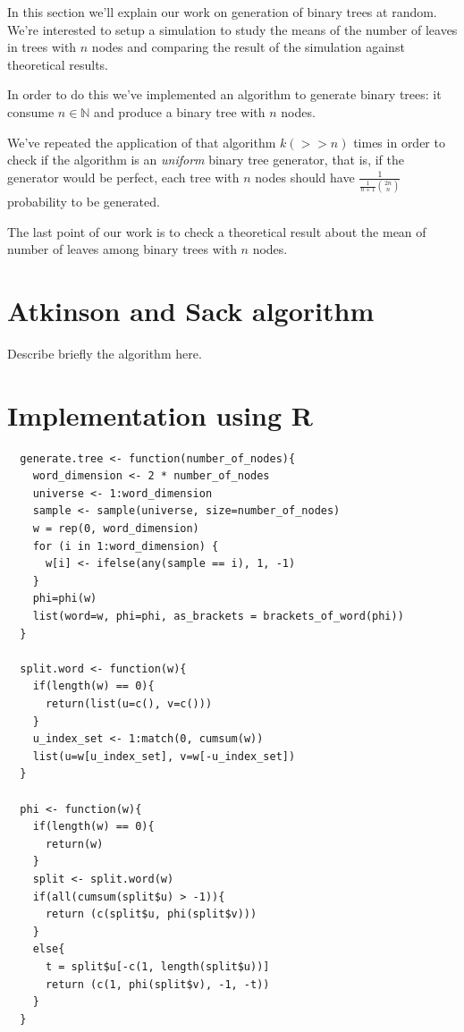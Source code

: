 In this section we'll explain our work on generation of binary trees
at random. We're interested to setup a simulation to study the means
of the number of leaves in trees with $n$ nodes and comparing the
result of the simulation against theoretical results.

In order to do this we've implemented an algorithm to generate binary
trees: it consume $n \in \mathbb{N} $ and produce a binary tree with
$n$ nodes.

We've repeated the application of that algorithm $k (>>
n)$ times in order to check if the algorithm is an \emph{uniform}
binary tree generator, that is, if the generator would be perfect,
each tree with $n$ nodes should have $ \frac{1}{
  \frac{1}{n+1}{{2n}\choose{n}} } $ probability to be generated.

The last point of our work is to check a theoretical result about the
mean of number of leaves among binary trees with $n$ nodes.


\section{Atkinson and Sack algorithm}
Describe briefly the algorithm here.

\section{Implementation using R}

\begin{lstlisting}
  generate.tree <- function(number_of_nodes){
    word_dimension <- 2 * number_of_nodes    
    universe <- 1:word_dimension
    sample <- sample(universe, size=number_of_nodes)
    w = rep(0, word_dimension)
    for (i in 1:word_dimension) {
      w[i] <- ifelse(any(sample == i), 1, -1)
    }    
    phi=phi(w)
    list(word=w, phi=phi, as_brackets = brackets_of_word(phi))
  }

  split.word <- function(w){
    if(length(w) == 0){
      return(list(u=c(), v=c()))
    }    
    u_index_set <- 1:match(0, cumsum(w))
    list(u=w[u_index_set], v=w[-u_index_set])
  }

  phi <- function(w){
    if(length(w) == 0){
      return(w)
    }    
    split <- split.word(w)     
    if(all(cumsum(split$u) > -1)){
      return (c(split$u, phi(split$v)))
    }
    else{
      t = split$u[-c(1, length(split$u))]
      return (c(1, phi(split$v), -1, -t))
    }
  }
\end{lstlisting}

